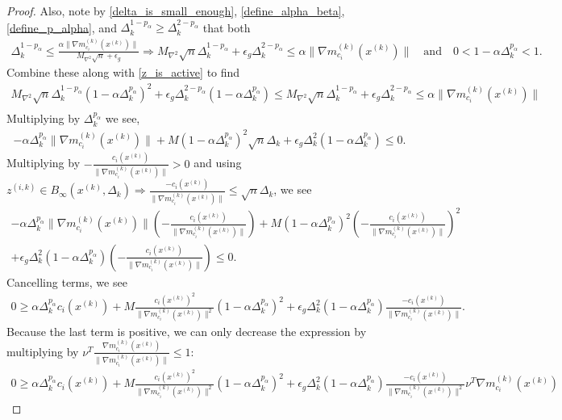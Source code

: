 \documentclass{article}
\theoremstyle{case}
\newcommand{\maxhessian}{{M_{\nabla^2}}}
\newcommand{\xk}{{x^{(k)}}}
\newcommand{\dk}{\Delta_k}
\newcommand{\zik}{{z^{(i, k)}}}
\newcommand{\gmcik}{{\nabla m_{c_i}^{(k)}(\xk)}}
\newcommand{\tr}{{ B_{\infty}\left(\xk, \dk\right) }}
\begin{document}
\begin{proof}
Also, note by \cref{delta_is_small_enough}, \cref{define_alpha_beta}, \cref{define_p_alpha}, and $\dk^{1 - p_{\alpha}} \ge \dk^{2 - p_{\alpha}}$ that both
\begin{align*}
\dk^{1-p_{\alpha}} \le \frac{\alpha \|\gmcik\|}{\maxhessian \sqrt{n} + \epsilon_g} \Longrightarrow 
\maxhessian \sqrt{n}\dk^{1- p_{\alpha}} + \epsilon_g \dk^{2 - p_{\alpha}} \le \alpha \|\gmcik\| \quad \text{and} \quad
0 < 1 - \alpha \dk^{p_{\alpha}} < 1.
\end{align*}
Combine these along with \cref{z_is_active} to find 
\begin{align*}
\maxhessian \sqrt{n}\dk^{1-p_{\alpha}}\left(1 - \alpha \dk^{p_{\alpha}}\right)^2  + \epsilon_g \dk^{2 - p_{\alpha}} \left(1 - \alpha \dk^{p_{\alpha}}\right)
\le \maxhessian \sqrt{n}\dk^{1 - p_{\alpha}} + \epsilon_g \dk^{2 - p_{\alpha}} \le \alpha \|\gmcik\| \\
\end{align*}
Multiplying by $\dk^{p_{\alpha}}$ we see,
\begin{align*}
-\alpha \dk^{p_{\alpha}}\|\gmcik\| + M \left(1 - \alpha \dk^{p_{\alpha}}\right)^2 \sqrt{n}\dk+ \epsilon_g \dk^2 \left(1 - \alpha \dk^{p_{\alpha}}\right) \le  0.
\end{align*}
Multiplying by $-\frac{c_i(\xk)}{\|\gmcik\|} > 0$ and using $\zik \in \tr \Longrightarrow \frac{-c_i(\xk)}{\|\gmcik\|} \le \sqrt{n}\dk$, we see
\begin{align*}
-\alpha \dk^{p_{\alpha}}\|\gmcik\|\left(-\frac{c_i(\xk)}{\|\gmcik\|}\right) + M \left(1 - \alpha \dk^{p_{\alpha}}\right)^2 \left(-\frac{c_i(\xk)}{\|\gmcik\|}\right)^2\\
+\epsilon_g \dk^2 \left(1 - \alpha \dk^{p_{\alpha}}\right)\left(-\frac{c_i(\xk)}{\|\gmcik\|}\right) \le 0.
\end{align*}
Cancelling terms, we see
\begin{align*}
0 \ge \alpha \dk^{p_{\alpha}} c_i(\xk) + M \frac {c_i(\xk)^2}{\|\gmcik\|^2}\left(1 - \alpha \dk^{p_{\alpha}}\right)^2 + \epsilon_g \dk^2 \left(1 - \alpha \dk^{p_{\alpha}}\right)\frac{-c_i(\xk)}{\|\gmcik\|}.
\end{align*}
Because the last term is positive, we can only decrease the expression by multiplying by $\nu^T \frac{\gmcik}{\|\gmcik\|} \le 1$:
\begin{align*}
0\ge \alpha \dk^{p_{\alpha}} c_i(\xk) + M \frac {c_i(\xk)^2}{\|\gmcik\|^2}\left(1 - \alpha \dk^{p_{\alpha}}\right)^2 + \epsilon_g \dk^2 \left(1 - \alpha \dk^{p_{\alpha}}\right)\frac{-c_i(\xk)}{\|\gmcik\|^2}\nu^T\gmcik

\end{align*}
\end{proof}
\end{document}
